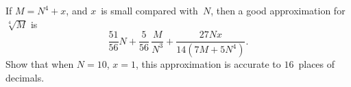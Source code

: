 If $M = N^{4} + x$, and $x$~is small compared with~$N$, then a good approximation
for~$\sqrt[4]{M}$ is
\[
\frac{51}{56} N + \frac{5}{56}\, \frac{M}{N^{3}} + \frac{27Nx}{14(7M + 5N^{4})}.
\]
Show that when $N = 10$, $x = 1$, this approximation is accurate to $16$~places
of decimals. 

